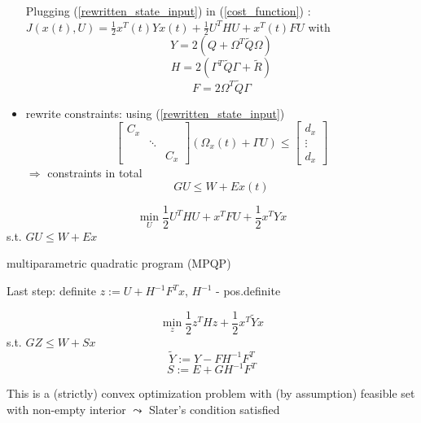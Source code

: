 \begin{itemize}
Plugging (\ref{rewritten_state_input}) in (\ref{cost_function}) : $J(x(t),U) = \frac{1}{2}x^T(t)Yx(t) + \frac{1}{2}U^THU + x^T(t)FU$
with
\begin{equation*}
Y = 2(Q + \Omega^T \tilde{Q} \Omega)
\end{equation*}
\begin{equation*}
H = 2(\Gamma^T\tilde{Q}\Gamma + \tilde{R})
\end{equation*}
\begin{equation*}
F = 2\Omega^T \tilde{Q} \Gamma
\end{equation*}

\item rewrite constraints: using (\ref{rewritten_state_input})
\begin{equation*}
\begin{bmatrix}
    C_x  & \  & \ \\
    \  &\ddots & \\
     \  & \ & C_x     
\end{bmatrix} (\Omega_x(t) + \Gamma U) \leq \begin{bmatrix}
   d_x \\
   \vdots \\
   d_x   
\end{bmatrix}
\end{equation*}
$\Rightarrow$ constraints in total
\begin{equation*}
GU \leq W + Ex(t)
\end{equation*}
\end{itemize}

\begin{equation}\label{standard_problem}
\min_U \frac{1}{2} U^THU + x^TFU + \frac{1}{2}x^TYx
\end{equation}
s.t. $GU \leq W + Ex$

multiparametric quadratic program (MPQP)

Last step: definite $z:=U+H^{-1}F^Tx$, $H^{-1}$ - pos.definite 

\begin{equation}\label{rewritten_problem}
\min_{z} \frac{1}{2}z^THz + \frac{1}{2}x^T \tilde{Y}x
\end{equation}
s.t. $GZ \leq W + Sx$
\begin{equation*}
\tilde{Y} := Y - FH^{-1}F^T
\end{equation*}
\begin{equation*}
S := E + GH^{-1}F^T
\end{equation*}

This is a (strictly) convex optimization problem with (by assumption) feasible set with non-empty interior $\leadsto$ Slater's condition satisfied

